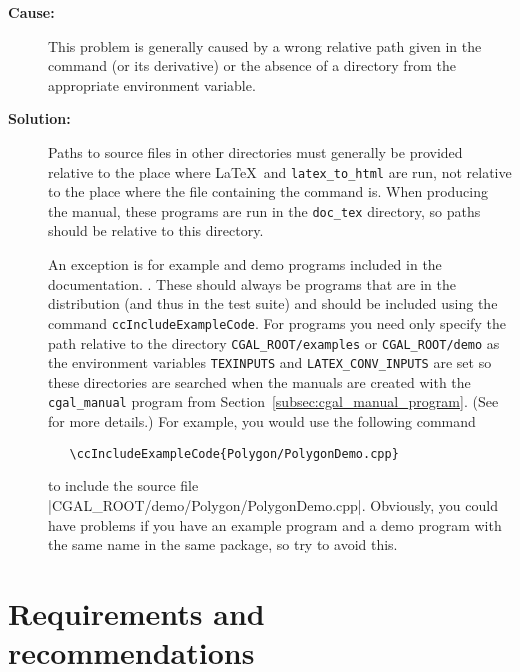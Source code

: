 \begin{description}
\item[{\bf Cause:}] This problem is generally caused by a wrong relative path
given in the \verb|| command (or its derivative) or the absence of a
directory from the appropriate environment variable.

\item[{\bf Solution:}] Paths to source files in other directories must
generally be provided relative to the place where \LaTeX\ and
\texttt{latex\_to\_html} are run, not relative to the place where
the file containing the command is.  When producing the manual,
these programs are run in the \texttt{doc\_tex} directory, so paths
should be relative to this directory.

An exception is for example and demo programs included in the documentation.
.  These should always
be programs that are in the distribution (and thus in the test suite)
and should be included using the command \texttt{ccIncludeExampleCode}.  For
programs you need only specify the path relative to the directory
\texttt{CGAL\_ROOT/examples} or \texttt{CGAL\_ROOT/demo} as the environment
variables \texttt{TEXINPUTS} and \texttt{LATEX\_CONV\_INPUTS} are set so these
directories are searched when the manuals are created with the
\texttt{cgal\_manual} program from Section~\ref{subsec:cgal_manual_program}.
(See
for more details.)
For example, you would use the following command
\begin{verbatim}
   \ccIncludeExampleCode{Polygon/PolygonDemo.cpp}
\end{verbatim}
to include the source file \nonlinkedpath|CGAL_ROOT/demo/Polygon/PolygonDemo.cpp|.
Obviously, you could have problems if you have an example program and a demo
program with the same name in the same package, so try to avoid this.
\end{description}


\section{Requirements and recommendations}
\label{sec:specification_req_and_rec}

